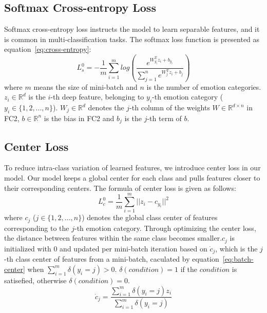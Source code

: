 \documentclass{article}
\begin{document}
\subsection{Softmax Cross-entropy Loss}
\label{ssec:cross-entropy}

Softmax cross-entropy loss instructs the model to learn separable features, and it is common in multi-classification tasks. The softmax loss function is presented as equation~\ref{eq:cross-entropy}:
\begin{equation} \label{eq:cross-entropy}
L_s^0 = - \frac{1}{m}\sum_{i=1}^{m}{log(\frac{e^{W_{y_i}^\mathrm{T}z_i+b_{y_i}}}{\sum_{j=1}^{n}e^{W_j^\mathrm{T}z_i+b_j}})}
\end{equation}
where $m$ means the size of mini-batch and $n$ is the number of emotion categories. $z_i \in \mathbb{R}^d$ is the $i$-th deep feature, belonging to $y_i$-th emotion category ($y_i \in  \{1, 2, ... , n\}$). $W_j \in \mathbb{R}^d$ denotes the $j$-th column of the weights $ W \in \mathbb{R}^{d \times n} $ in FC2, $b \in \mathbb{R} ^ n $ is the bias in FC2 and $ b_j $ is the $j$-th term of $b$.

\subsection{Center Loss}
To reduce intra-class variation of learned features, we introduce center loss in our model. Our model keeps a global center for each class and pulls features closer to their corresponding centers. The formula of center loss is given as follows:
\begin{equation} \label{eq:center-loss}
L_c^0=\frac{1}{m}\sum_{i=1}^{m}||z_i - c_{y_i}||^2
\end{equation}
where $c_j$ ($j \in \{1, 2, ... , n\}$) denotes the global class center of features corresponding to the $j$-th emotion category. Through optimizing the center loss, the distance between features within the same class becomes smaller.$c_j$ is initialized with 0 and updated per mini-batch iteration based on $\dot{c}_j$, which is the $j$-th class center of features from a mini-batch, caculated by equation~\ref{eq:batch-center} when $\sum_{i=1}^{m}\delta(y_i = j) > 0$. $\delta(condition) = 1$ if the $condition$ is satisefied, otherwise $\delta(condition) = 0$.
\begin{equation} \label{eq:batch-center}
\dot{c}_j = \frac{\sum_{i=1}^{m}\delta(y_i = j) z_i}{\sum_{i=1}^{m}\delta(y_i = j)}
\end{equation}
\end{document}
